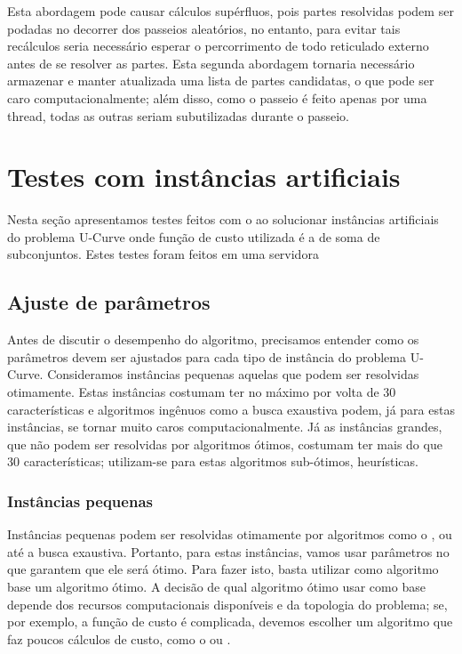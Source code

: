 Esta abordagem pode causar cálculos supérfluos, pois partes resolvidas
podem ser podadas no decorrer dos passeios aleatórios, no entanto, para 
evitar tais recálculos seria necessário esperar o percorrimento de todo
reticulado externo antes de se resolver as partes. Esta segunda 
abordagem tornaria necessário armazenar e manter atualizada uma lista de 
partes candidatas, o que pode ser caro computacionalmente; além disso, 
como o passeio é feito apenas por uma thread, todas as outras seriam
subutilizadas durante o passeio. 

\section{Testes com instâncias artificiais}
Nesta seção apresentamos testes feitos com o  ao  
solucionar instâncias artificiais do problema U-Curve onde função de 
custo utilizada é a de soma de subconjuntos. Estes testes foram feitos
em uma servidora %

\subsection{Ajuste de parâmetros}
Antes de discutir o desempenho do algoritmo, precisamos entender como
os parâmetros devem ser ajustados para cada tipo de instância do 
problema U-Curve. Consideramos instâncias pequenas aquelas que podem ser
resolvidas otimamente. Estas instâncias costumam ter no máximo por volta
de 30 características e algoritmos ingênuos como a busca exaustiva 
podem, já para estas instâncias, se tornar muito caros 
computacionalmente. Já as instâncias grandes, que não podem ser 
resolvidas por algoritmos ótimos, costumam ter mais do que 30 
características; utilizam-se para estas algoritmos sub-ótimos, 
heurísticas.

\subsubsection{Instâncias pequenas}
Instâncias pequenas podem ser resolvidas otimamente por algoritmos
como o ,  ou até a busca exaustiva. Portanto, 
para estas instâncias, vamos usar parâmetros no  que 
garantem que ele será ótimo. Para fazer isto, basta utilizar como 
algoritmo base um algoritmo ótimo. A decisão de qual algoritmo ótimo
usar como base depende dos recursos computacionais disponíveis e da 
topologia do problema; se, por exemplo, a função de custo é complicada, 
devemos escolher um algoritmo que faz poucos cálculos de custo, como o 
 ou .

